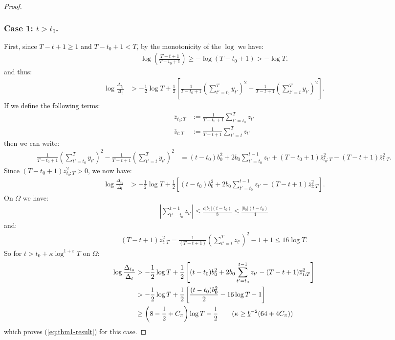 \begin{proof}
\subsubsection*{Case 1: $t > t_0$.}

First, since $T-t +1\geq 1$ and $T-t_0+1 < T$, by the monotonicity of the $\log$ we have: 
\begin{align*}
    \log \left(\frac{T-t+1}{T-t_0+1}\right) \geq -\log(T-t_0+1) > -\log T.
\end{align*}
and thus:
\begin{align*}
    \log \frac{\Delta_{t_0}}{\Delta_t} &> -\frac{1}{2} \log T + \frac{1}{2} \left[\frac{1}{T-t_0+1}\left(\sum_{t'=t_0}^{T} y_{t'}\right)^2- \frac{1}{T-t+1}\left(\sum_{t'=t}^{T} y_{t'}\right)^2\right]. 
\end{align*}
If we define the following terms:
\begin{align*}
    \overline{z}_{t_0:T} &:= \frac{1}{T-t_0+1}\sum_{t'=t_0}^T z_{t'} \\
    \overline{z}_{t:T} &:= \frac{1}{T-t+1}\sum_{t'=t}^T z_{t'}
\end{align*}
then we can write:
\small
\begin{align*}
    \frac{1}{T-t_0+1}\left(\sum_{t'=t_0}^{T} y_{t'}\right)^2- \frac{1}{T-t+1}\left(\sum_{t'=t}^{T} y_{t'}\right)^2 &= (t-t_0)b_0^2 + 2b_0\sum_{t'=t_0}^{t-1}z_{t'} + (T-t_0+1) \overline{z}^2_{t_0:T} - (T-t+1)\overline{z}^2_{t:T}.
\end{align*}
\normalsize
Since $(T-t_0+1) \overline{z}^2_{t_0:T} > 0$, we now have: 
\begin{align*}
    \log \frac{\Delta_{t_0}}{\Delta_t} &> -\frac{1}{2} \log T + \frac{1}{2} \left[(t-t_0)b_0^2 + 2b_0\sum_{t'=t_0}^{t-1}z_{t'} - (T-t+1)\overline{z}^2_{t:T}\right].
\end{align*}
On $\Omega$ we have:
\begin{align*}
    \left|\sum_{t'=t_0}^{t-1}z_{t'}\right| \leq \frac{c|b_0|(t-t_0)}{8} \leq \frac{|b_0|(t-t_0)}{4}
\end{align*}
and:
\begin{align*}
    (T-t+1)\overline{z}^2_{t:T} = \frac{1}{(T-t+1)}\left(\sum_{t'=t}^T z_{t'}\right)^2 - 1 +1 \leq 16\log T.
\end{align*}
So for $t > t_0 + \kappa \log^{1+\varepsilon} T$ on $\Omega$:
\begin{align*}
    \log \frac{\Delta_{t_0}}{\Delta_t}  &> -\frac{1}{2} \log T + \frac{1}{2} \left[(t-t_0)b_0^2 + 2b_0\sum_{t'=t_0}^{t-1}z_{t'} - (T-t+1)\overline{z}^2_{t:T}\right]\\
    &> -\frac{1}{2} \log T + \frac{1}{2} \left[\frac{(t-t_0)b_0^2 }{2}- 16 \log T -1\right]  \\
    &\geq \left(8 - \frac{1}{2} + C_\pi\right) \log T - \frac{1}{2} \tag{$\kappa \geq \underline{b}^{-2}(64 + 4 C_\pi)$}
\end{align*}
which proves (\ref{eq:thm1-result}) for this case.


\end{proof}
